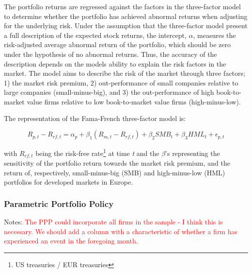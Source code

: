 The portfolio returns are regressed against the factors in the \cite{Fama_french_3fac} three-factor model to determine whether the portfolio has achieved abnormal returns when adjusting for the underlying risk. Under the assumption that the three-factor model present a full description of the expected stock returns, the intercept, $\alpha$, measures the risk-adjusted average abnormal return of the portfolio, which should be zero under the hypothesis of no abnormal returns. Thus, the accuracy of the description depends on the models ability to explain the risk factors in the market. The model aims to describe the risk of the market through three factors; 1) the market risk premium, 2) out-performance of small companies relative to large companies (small-minus-big), and 3) the out-performance of high book-to-market value firms  relative to low book-to-market value firms (high-minus-low). 

The representation of the Fama-French three-factor model is:

\begin{equation}
    R_{p,t} - R_{rf,t} = \alpha_p + \beta_1(R_{m,t} - R_{rf,t}) + \beta_2 SMB_t + \beta_3 HML_t + \epsilon_{p,t} 
\end{equation}

with $R_{rf,t}$ being the risk-free rate\footnote{US treasuries / EUR treasuries} at time \textit{t} and the $\beta$'s representing the sensitivity of the portfolio return towards the market risk premium, and the return of, respectively, small-minus-big (SMB) and high-minus-low (HML) portfolios for developed markets in Europe.   

\subsubsection{Parametric Portfolio Policy}

Notes:
\textcolor{red}{The PPP could incorporate all firms in the sample - I think this is necessary. We should add a column with a characteristic of whether a firm has experienced an event in the foregoing month.}
